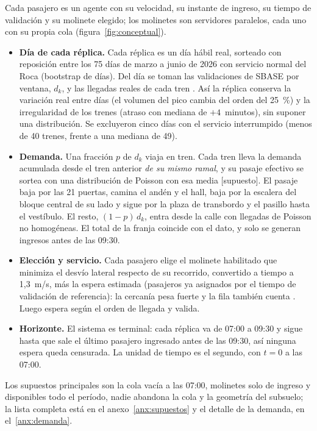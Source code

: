 Cada pasajero es un agente con su velocidad, su instante de ingreso, su tiempo de validación y su molinete
elegido; los molinetes son servidores paralelos, cada uno con su propia cola (figura~\ref{fig:conceptual}).
\begin{itemize}
  \item \textbf{Día de cada réplica.} Cada réplica es un día hábil real, sorteado con reposición entre los 75
        días de marzo a junio de 2026 con servicio normal del Roca (bootstrap de días). Del día se toman las
        validaciones de SBASE por ventana, $d_k$, y las llegadas reales de cada tren \parencite{sofse2026nota}.
        Así la réplica conserva la variación real entre días (el volumen del pico cambia del orden del 25~\%) y
        la irregularidad de los trenes (atraso con mediana de $+4$~minutos), sin suponer una distribución. Se
        excluyeron cinco días con el servicio interrumpido (menos de 40 trenes, frente a una mediana de 49).
  \item \textbf{Demanda.} Una fracción $p$ de $d_k$ viaja en tren. Cada tren lleva la demanda acumulada desde
        el tren anterior \emph{de su mismo ramal}, y su pasaje efectivo se sortea con una distribución de
        Poisson con esa media [supuesto]. El pasaje baja por las 21 puertas, camina el andén y el hall, baja por
        la escalera del bloque central de su lado y sigue por la plaza de transbordo y el pasillo hasta el
        vestíbulo. El resto, $(1-p)\,d_k$, entra desde la calle con llegadas de Poisson no homogéneas. El total
        de la franja coincide con el dato, y solo se generan ingresos antes de las 09:30.
  \item \textbf{Elección y servicio.} Cada pasajero elige el molinete habilitado que minimiza el desvío lateral
        respecto de su recorrido, convertido a tiempo a 1,3~m/s, más la espera estimada (pasajeros ya
        asignados por el tiempo de validación de referencia): la cercanía pesa fuerte
        \parencite{seriani2025,tian2026} y la fila también cuenta \parencite{wang2024}. Luego espera según el
        orden de llegada y valida.
  \item \textbf{Horizonte.} El sistema es terminal: cada réplica va de 07:00 a 09:30 y sigue hasta que sale el
        último pasajero ingresado antes de las 09:30, así ninguna espera queda censurada. La unidad de tiempo es
        el segundo, con $t = 0$ a las 07:00.
\end{itemize}
Los supuestos principales son la cola vacía a las 07:00, molinetes solo de ingreso y disponibles todo el
período, nadie abandona la cola y la geometría del subsuelo; la lista completa está en el
anexo~\ref{anx:supuestos} y el detalle de la demanda, en el~\ref{anx:demanda}.

